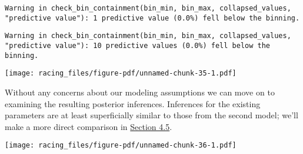 \documentclass[
  letterpaper,
  DIV=11,
  numbers=noendperiod]{scrartcl}
\newenvironment{Shaded}{\begin{snugshade}}{\end{snugshade}}
\newcommand{\AttributeTok}[1]{\textcolor[rgb]{0.40,0.45,0.13}{#1}}
\newcommand{\DecValTok}[1]{\textcolor[rgb]{0.68,0.00,0.00}{#1}}
\newcommand{\FunctionTok}[1]{\textcolor[rgb]{0.28,0.35,0.67}{#1}}
\newcommand{\NormalTok}[1]{\textcolor[rgb]{0.00,0.23,0.31}{#1}}
\newcommand{\SpecialCharTok}[1]{\textcolor[rgb]{0.37,0.37,0.37}{#1}}
\newcommand{\StringTok}[1]{\textcolor[rgb]{0.13,0.47,0.30}{#1}}
\begin{document}
\begin{verbatim}
Warning in check_bin_containment(bin_min, bin_max, collapsed_values,
"predictive value"): 1 predictive value (0.0%) fell below the binning.
\end{verbatim}

\begin{verbatim}
Warning in check_bin_containment(bin_min, bin_max, collapsed_values,
"predictive value"): 10 predictive values (0.0%) fell below the binning.
\end{verbatim}

\texttt{[image: racing\_files/figure-pdf/unnamed-chunk-35-1.pdf]}

Without any concerns about our modeling assumptions we can move on to
examining the resulting posterior inferences. Inferences for the
existing parameters are at least superficially similar to those from the
second model; we'll make a more direct comparison in
\hyperref[sec:inf-comp]{Section 4.5}.

\begin{Shaded}
\end{Shaded}

\texttt{[image: racing\_files/figure-pdf/unnamed-chunk-36-1.pdf]}
\end{document}
